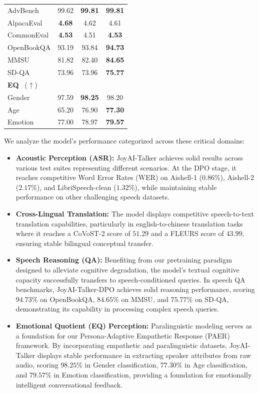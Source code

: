 \begin{table}[ht]
\begin{tabular}{lccc}
\quad AdvBench & 99.62 & \textbf{99.81} & \textbf{99.81} \\
\quad AlpacaEval & \textbf{4.68} & 4.62 & 4.61 \\
\quad CommonEval & \textbf{4.53} & 4.51 & \textbf{4.53} \\
\quad OpenBookQA & 93.19 & 93.84 & \textbf{94.73} \\
\quad MMSU & 81.82 & 82.40 & \textbf{84.65} \\
\quad SD-QA & 73.96 & 73.96 & \textbf{75.77} \\
\hline
\rowcolor[gray]{0.92} \textbf{EQ} ~($\uparrow$) & & & \\
\quad Gender & 97.59 & \textbf{98.25} & 98.20 \\
\quad Age & 65.20 & 76.90 & \textbf{77.30} \\
\quad Emotion & 77.00 & 78.97 & \textbf{79.57} \\
\bottomrule

\end{tabular}
\end{table}

We analyze the model's performance categorized across these critical domains:

\begin{itemize}
    \item \textbf{Acoustic Perception (ASR):} JoyAI-Talker achieves solid results across various test suites representing different scenarios. At the DPO stage, it reaches competitive Word Error Rates (WER) on Aishell-1 ($0.86\%$), Aishell-2 ($2.17\%$), and LibriSpeech-clean ($1.32\%$), while maintaining stable performance on other challenging speech datasets.
    
    \item \textbf{Cross-Lingual Translation:} The model displays competitive speech-to-text translation capabilities, particularly in english-to-chinese translation tasks where it reaches a CoVoST-2 score of $51.29$ and a FLEURS score of $43.99$, ensuring stable bilingual conceptual transfer.
    
    \item \textbf{Speech Reasoning (QA):} Benefiting from our pretraining paradigm designed to alleviate cognitive degradation, the model's textual cognitive capacity successfully transfers to speech-conditioned queries. In speech QA benchmarks, JoyAI-Talker-DPO achieves solid reasoning performance, scoring $94.73\%$ on OpenBookQA, $84.65\%$ on MMSU, and $75.77\%$ on SD-QA, demonstrating its capability in processing complex speech queries.
    
    \item \textbf{Emotional Quotient (EQ) Perception:} Paralinguistic modeling serves as a foundation for our Persona-Adaptive Empathetic Response (PAER) framework. By incorporating empathetic and paralinguistic datasets, JoyAI-Talker displays stable performance in extracting speaker attributes from raw audio, scoring $98.25\%$ in Gender classification, $77.30\%$ in Age classification, and $79.57\%$ in Emotion classification, providing a foundation for emotionally intelligent conversational feedback.
\end{itemize}

